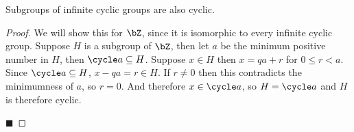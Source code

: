 \documentclass[10pt]{article}
\begin{document}
\begin{thrm*}

    Subgroups of infinite cyclic groups are also cyclic.

\end{thrm*}

\begin{proof}

    We will show this for $\bZ$, since it is isomorphic to every infinite cyclic group.
    Suppose $H$ is a subgroup of $\bZ$, then let $a$ be the minimum positive number in $H$, then $\cycle a\subseteq H$.
    Suppose $x\in H$ then $x=qa+r$ for $0\leq r<a$.
    Since $\cycle a\subseteq H$, $x-qa=r\in H$.
    If $r\neq0$ then this contradicts the minimumness of $a$, so $r=0$.
    And therefore $x\in\cycle a$, so $H=\cycle a$ and $H$ is therefore cyclic.

    \hfill$\blacksquare$

\end{proof}
\end{document}
